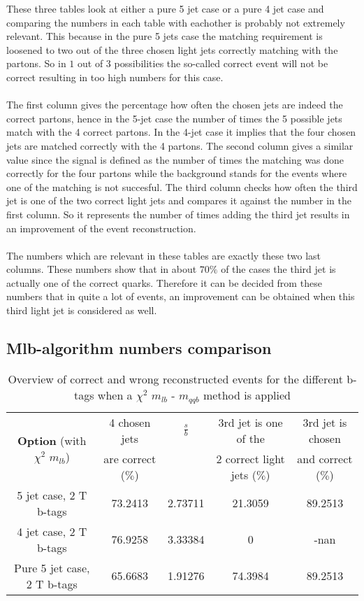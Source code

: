 \documentclass[a4paper,12pt]{report}
\begin{document}
These three tables look at either a pure 5 jet case or a pure 4 jet case and comparing the numbers in each table with eachother is probably not extremely relevant. This because in the pure 5 jets case the matching requirement is loosened to two out of the three chosen light jets correctly matching with the partons. So in $1$ out of $3$ possibilities the so-called correct event will not be correct resulting in too high numbers for this case.\\
\\
The first column gives the percentage how often the chosen jets are indeed the correct partons, hence in the 5-jet case the number of times the 5 possible jets match with the 4 correct partons. In the 4-jet case it implies that the four chosen jets are matched correctly with the 4 partons. The second column gives a similar value since the signal is defined as the number of times the matching was done correctly for the four partons while the background stands for the events where one of the matching is not succesful. The third column checks how often the third jet is one of the two correct light jets and compares it against the number in the first column. So it represents the number of times adding the third jet results in an improvement of the event reconstruction. \\
\\
The numbers which are relevant in these tables are exactly these two last columns. These numbers show that in about $70 \%$ of the cases the third jet is actually one of the correct quarks. Therefore it can be decided from these numbers that in quite a lot of events, an improvement can be obtained when this third light jet is considered as well.

\subsection{Mlb-algorithm numbers comparison}
  \begin{table}[!h] 
 \begin{tabular}{c|c|c|c|c} 
\multirow{2}{*}{\textbf{Option} (with $\chi^{2}$ $m_{lb}$)} & 4 chosen jets & $\frac{s}{b}$ & 3rd jet is one of the & 3rd jet is chosen \\ & are correct ($\%$)    & 	             & 2 correct light jets ($\%$) &  and correct ($\%$)	  \\ \hline 
 5 jet case,      2 T b-tags              & 73.2413 & 2.73711 & 21.3059 & 89.2513 \\ 
 4 jet case,      2 T b-tags              & 76.9258 & 3.33384 & 0 & -nan \\ 
 Pure 5 jet case, 2 T b-tags              & 65.6683 & 1.91276 & 74.3984 & 89.2513 \\ 
 \end{tabular} 
 \caption{Overview of correct and wrong reconstructed events for the different b-tags when a $\chi^{2}$ $m_{lb}$ - $m_{qqb}$ method is applied} 
 \end{table} 
 
\end{document}
